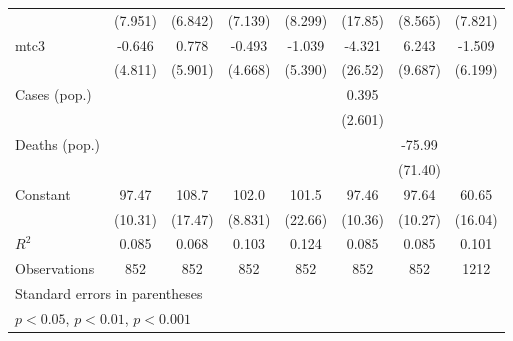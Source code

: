\documentclass{article}
\begin{document}
{\begin{longtable}{l*{7}{c}}
                &  (7.951)         &  (6.842)         &  (7.139)         &  (8.299)         &  (17.85)         &  (8.565)         &  (7.821)         \\
mtc3            &   -0.646         &    0.778         &   -0.493         &   -1.039         &   -4.321         &    6.243         &   -1.509         \\
                &  (4.811)         &  (5.901)         &  (4.668)         &  (5.390)         &  (26.52)         &  (9.687)         &  (6.199)         \\
Cases (pop.)    &                  &                  &                  &                  &    0.395         &                  &                  \\
                &                  &                  &                  &                  &  (2.601)         &                  &                  \\
Deaths (pop.)   &                  &                  &                  &                  &                  &   -75.99         &                  \\
                &                  &                  &                  &                  &                  &  (71.40)         &                  \\
Constant        &    97.47\sym{***}&    108.7\sym{**} &    102.0\sym{***}&    101.5\sym{**} &    97.46\sym{***}&    97.64\sym{***}&    60.65\sym{*}  \\
                &  (10.31)         &  (17.47)         &  (8.831)         &  (22.66)         &  (10.36)         &  (10.27)         &  (16.04)         \\
\hline
\(R^{2}\)       &    0.085         &    0.068         &    0.103         &    0.124         &    0.085         &    0.085         &    0.101         \\
Observations    &      852         &      852         &      852         &      852         &      852         &      852         &     1212         \\
\hline\hline
\multicolumn{8}{l}{\footnotesize Standard errors in parentheses}\\
\multicolumn{8}{l}{\footnotesize \sym{*} \(p<0.05\), \sym{**} \(p<0.01\), \sym{***} \(p<0.001\)}\\
\end{longtable}
}
\end{document}
